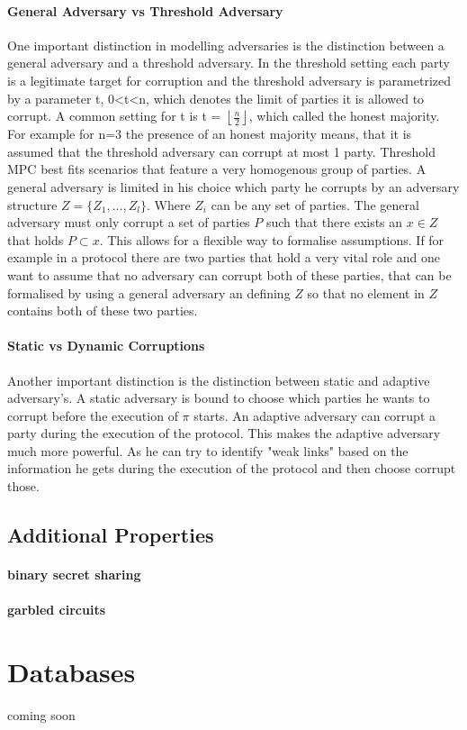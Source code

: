 \paragraph{General Adversary vs Threshold Adversary}
One important distinction in modelling adversaries is the distinction between a general adversary and a threshold adversary.
In the threshold setting each party is a legitimate target for corruption and the threshold adversary is parametrized by a parameter t, 0<t<n, which denotes the limit of parties it is allowed to corrupt. A common setting for t is t = $\left \lfloor{ \frac{n}{2} }\right \rfloor  $, which called the honest majority. For example for n=3 the presence of an honest majority means, that it is assumed that the threshold adversary can corrupt at most 1 party. Threshold MPC best fits scenarios that feature a very homogenous group of parties. A general adversary is limited in his choice which party he corrupts by an adversary structure  
$ Z = \{ Z_1, \dots, Z_l  \} $. Where $ Z_i $ can be any set of parties. The general adversary must only corrupt a set of parties  $ P $ such that there exists an $ x \in Z $ that holds $ P \subset x $. This allows for a flexible way to formalise assumptions. If for example in a protocol there are two parties that hold a very vital role and one want to assume that no adversary can corrupt both of these parties, that can be formalised by using a general adversary an defining $ Z $ so that no element in  $Z $ contains both of these two parties.  
 
\paragraph{Static vs Dynamic Corruptions}
Another important distinction is the distinction between static and adaptive adversary's. A static adversary is bound to choose which parties he wants to corrupt before the execution of $ \pi $ starts. An adaptive adversary can corrupt a party during the execution of the protocol. This makes the adaptive adversary much more powerful. As he can try to identify "weak links" based on the information he gets during the execution of the protocol and then choose corrupt those.   


\subsection{Additional Properties}
\paragraph{binary secret sharing} 
\paragraph{garbled circuits}

\section{Databases}
\label{Databases}
coming soon